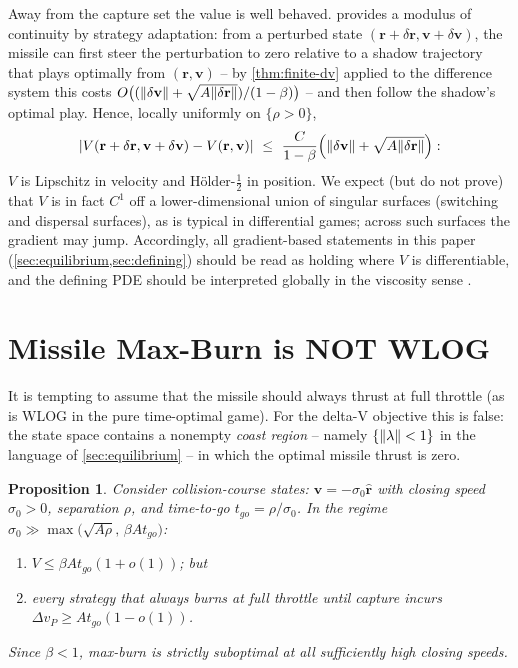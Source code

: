 \documentclass{article}
\renewcommand{\vec}[1]{\mathbf{#1}}
\newtheorem{proposition}[theorem]{Proposition}
\theoremstyle{remark}
\begin{document}
Away from the capture set the value is well behaved.  
provides a modulus of continuity by strategy adaptation: from a perturbed
state $(\vec r + \delta\vec r, \vec v + \delta\vec v)$, the missile can first
steer the perturbation to zero relative to a shadow trajectory that plays
optimally from $(\vec r, \vec v)$ -- by \cref{thm:finite-dv} applied to the
difference system this costs
$O\big((\norm{\delta \vec v} + \sqrt{A \norm{\delta \vec r}})/(1-\beta)\big)$
-- and then follow the shadow's optimal play.  Hence, locally uniformly on
$\{\rho > 0\}$,
\[
  \abs{V(\vec r + \delta \vec r, \vec v + \delta \vec v) - V(\vec r, \vec v)}
  \ \le\ \frac{C}{1-\beta} \Big( \norm{\delta \vec v} + \sqrt{A
    \norm{\delta\vec r}} \Big):
\]
$V$ is Lipschitz in velocity and H\"older-$\tfrac12$ in position.  We expect
(but do not prove) that $V$ is in fact $C^1$ off a lower-dimensional union of
singular surfaces (switching and dispersal surfaces), as is typical in
differential games; across such surfaces the gradient may jump.  Accordingly,
all gradient-based statements in this paper (\cref{sec:equilibrium,sec:defining})
should be read as holding where $V$ is differentiable, and the defining PDE
should be interpreted globally in the viscosity sense
\cite{crandalllions1983,evanssouganidis1984,bardi1997}.

\section{Missile Max-Burn is NOT WLOG}
\label{sec:coast}

It is tempting to assume that the missile should always thrust at full
throttle (as is WLOG in the pure time-optimal game).  For the delta-V
objective this is false: the state space contains a nonempty \emph{coast
  region} -- namely $\{\norm{\vec\lambda} < 1\}$ in the language of
\cref{sec:equilibrium} -- in which the optimal missile thrust is zero.

\begin{proposition}
  \label{prop:coast}
  Consider collision-course states: $\vec v = -\sigma_0 \hat{\vec r}$ with
  closing speed $\sigma_0 > 0$, separation $\rho$, and time-to-go
  $t_{go} = \rho / \sigma_0$.  In the regime
  $\sigma_0 \gg \max\big(\sqrt{A\rho},\, \beta A t_{go}\big)$:
  \begin{enumerate}
  \item $V \le \beta A t_{go} (1 + o(1))$; but
  \item every strategy that always burns at full throttle until capture incurs
    $\Delta v_P \ge A t_{go} (1 - o(1))$.
  \end{enumerate}
  Since $\beta < 1$, max-burn is strictly suboptimal at all sufficiently high
  closing speeds.
\end{proposition}
\end{document}
